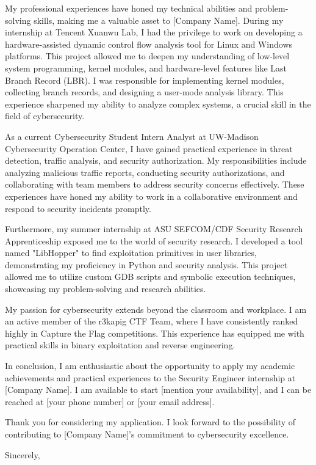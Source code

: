 \documentclass[12pt]{letter} %
\begin{document}
\begin{letter}
My professional experiences have honed my technical abilities and problem-solving skills, making me a valuable asset to [Company Name]. During my internship at Tencent Xuanwu Lab, I had the privilege to work on developing a hardware-assisted dynamic control flow analysis tool for Linux and Windows platforms. This project allowed me to deepen my understanding of low-level system programming, kernel modules, and hardware-level features like Last Branch Record (LBR). I was responsible for implementing kernel modules, collecting branch records, and designing a user-mode analysis library. This experience sharpened my ability to analyze complex systems, a crucial skill in the field of cybersecurity.

As a current Cybersecurity Student Intern Analyst at UW-Madison Cybersecurity Operation Center, I have gained practical experience in threat detection, traffic analysis, and security authorization. My responsibilities include analyzing malicious traffic reports, conducting security authorizations, and collaborating with team members to address security concerns effectively. These experiences have honed my ability to work in a collaborative environment and respond to security incidents promptly.

Furthermore, my summer internship at ASU SEFCOM/CDF Security Research Apprenticeship exposed me to the world of security research. I developed a tool named "LibHopper" to find exploitation primitives in user libraries, demonstrating my proficiency in Python and security analysis. This project allowed me to utilize custom GDB scripts and symbolic execution techniques, showcasing my problem-solving and research abilities.

My passion for cybersecurity extends beyond the classroom and workplace. I am an active member of the r3kapig CTF Team, where I have consistently ranked highly in Capture the Flag competitions. This experience has equipped me with practical skills in binary exploitation and reverse engineering.

In conclusion, I am enthusiastic about the opportunity to apply my academic achievements and practical experiences to the Security Engineer internship at [Company Name]. I am available to start [mention your availability], and I can be reached at [your phone number] or [your email address].

Thank you for considering my application. I look forward to the possibility of contributing to [Company Name]'s commitment to cybersecurity excellence.

\closing{Sincerely,}




\end{letter}
\end{document}
